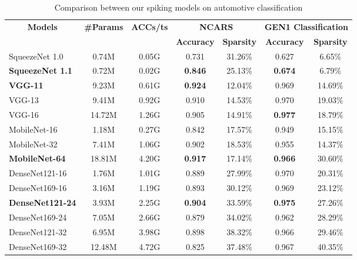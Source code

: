 \documentclass[conference]{IEEEtran}
\begin{document}
\begin{table*}[]
\renewcommand{\arraystretch}{1.3}
\centering
\caption{Comparison between our spiking models on automotive classification}
\begin{tabular}{lcccccc}
\hline
\multicolumn{1}{c}{\multirow{2}{*}{\textbf{Models}}} & \multicolumn{1}{c}{\multirow{2}{*}{\textbf{\#Params}}} & \multicolumn{1}{c}{\multirow{2}{*}{\textbf{ACCs/ts}}} & \multicolumn{2}{c}{\textbf{NCARS}}                                   & \multicolumn{2}{c}{\textbf{GEN1 Classification}}        \\ 
\multicolumn{1}{c}{}                        & \multicolumn{1}{c}{}                          & \multicolumn{1}{c}{}                     & \multicolumn{1}{c}{\textbf{Accuracy }} & \multicolumn{1}{c}{\textbf{Sparsity }} & \multicolumn{1}{c}{\textbf{Accuracy }} & \multicolumn{1}{c}{\textbf{Sparsity }} \\
\hline
SqueezeNet 1.0 & 0.74M & 0.05G        & 0.731 & 31.26\% & 0.627 & 6.65\%   \\
\textbf{SqueezeNet 1.1} & 0.72M & 0.02G        & \textbf{0.846} & 25.13\% & \textbf{0.674} & 6.79\%  \\
\hline
\textbf{VGG-11}     & 9.23M  & 0.61G        & \textbf{0.924} & 12.04\% & 0.969 & 14.69\%   \\ 
VGG-13     & 9.41M  & 0.92G        & 0.910 & 14.53\% & 0.970 & 19.03\%    \\ 
VGG-16     & 14.72M  & 1.26G       & 0.905 & 14.91\% & \textbf{0.977} & 18.79\%   \\ 
\hline
MobileNet-16  & 1.18M & 0.27G         & 0.842      &  17.57\% & 0.949 & 15.15\%        \\
MobileNet-32 & 7.41M & 1.06G         & 0.902   & 18.53\% & 0.955 & 14.37\%        \\
\textbf{MobileNet-64} & 18.81M & 4.20G         & \textbf{0.917}      & 17.14\%  & \textbf{0.966} & 30.60\%         \\
\hline
DenseNet121-16   & 1.76M   & 1.01G          & 0.889 & 27.99\% & 0.970 & 20.31\%   \\ 
DenseNet169-16   & 3.16M   & 1.19G          & 0.893 & 30.12\% & 0.969 & 23.12\%   \\ 
\textbf{DenseNet121-24}   & 3.93M   & 2.25G          & \textbf{0.904} & 33.59\% & \textbf{0.975} & 27.26\%   \\ 
DenseNet169-24   & 7.05M   & 2.66G          & 0.879 & 34.02\% & 0.962 & 28.29\%   \\ 
DenseNet121-32   & 6.95M   & 3.98G          & 0.898 & 38.32\% & 0.966 & 29.46\%   \\ 
DenseNet169-32   & 12.48M   & 4.72G         & 0.825 & 37.48\% & 0.967 & 40.35\%   \\ 

\hline
\end{tabular}
\label{tab:autoclassif}
\end{table*}
\end{document}
